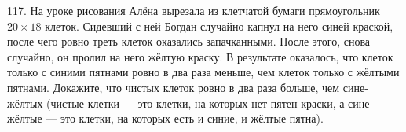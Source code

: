 117. На уроке рисования Алёна вырезала из клетчатой бумаги прямоугольник $20\times18$ клеток. Сидевший с ней Богдан случайно капнул на него синей краской, после чего ровно треть клеток оказались запачканными. После этого, снова случайно, он пролил на него жёлтую краску. В результате оказалось, что клеток только с синими пятнами ровно в два раза меньше, чем клеток только с жёлтыми пятнами. Докажите, что чистых клеток ровно в два раза больше, чем сине-жёлтых (чистые клетки --- это клетки, на которых нет пятен краски, а сине-жёлтые --- это клетки, на которых есть и синие, и жёлтые пятна).\\
